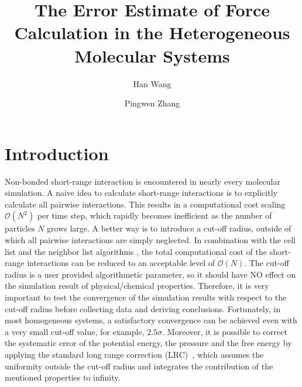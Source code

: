 \documentclass[aps,pre,preprint]{revtex4}
\begin{document}
\title{The Error Estimate of Force Calculation in the Heterogeneous Molecular Systems}
\author{Han Wang}
\author{Pingwen Zhang}

\begin{abstract}
\end{abstract}

\maketitle

\section{Introduction}
Non-bonded short-range interaction is encountered in nearly every
molecular simulation.  A naive idea to calculate short-range
interactions is to explicitly calculate all pairwise
interactions. This results in a computational cost scaling $\mathcal
O(N^2)$ per time step, which rapidly becomes inefficient as the number
of particles $N$ grows large. A better way is to introduce a cut-off
radius, outside of which all pairwise interactions are simply
neglected. In combination with the cell list and the neighbor list
algorithms \cite{frenkel02b}, the total computational cost of the
short-range interactions can be reduced to an acceptable level of
$\mathcal O(N)$. The cut-off radius is a user provided algorithmetic
parameter, so it should have NO effect on the simulation result of
physical/chemical properties.  Therefore, it is very important to test
the convergence of the simulation results with respect to the cut-off
radius before collecting data and deriving conclusions. Fortunately,
in most homogeneous systems, a satisfactory convergence can be
achieved even with a very small cut-off value, for example,
$2.5\sigma$.  Moreover, it is possible to correct the systematic error
of the potential energy, the pressure and the free energy by applying
the standard long range correction (LRC)~\cite{allen87a}, which
assumes the uniformity outside the cut-off radius and integrates the
contribution of the mentioned properties to infinity. 
\end{document}
